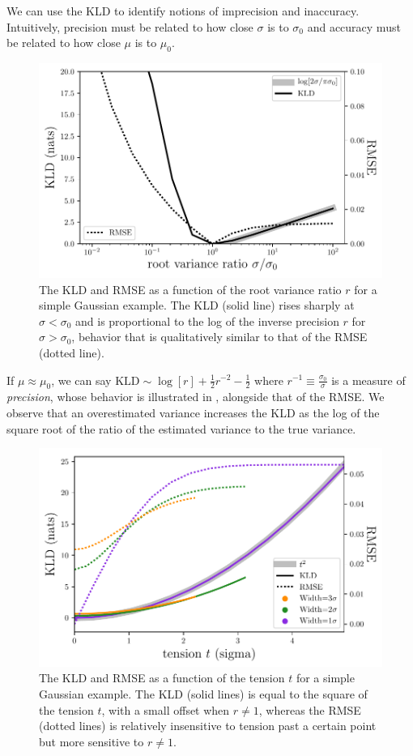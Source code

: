 We can use the KLD to identify notions of imprecision and inaccuracy.
Intuitively, precision must be related to how close $\sigma$ is to $\sigma_{0}$ 
and accuracy must be related to how close $\mu$ is to $\mu_{0}$.

\begin{figure}
	\begin{center}
		\includegraphics[width=0.74\columnwidth]{figures/qp/precision.pdf}
		\caption{The KLD and RMSE as a function of the root variance ratio $r$ for 
			a simple Gaussian example.
			The KLD (solid line) rises sharply at $\sigma<\sigma_{0}$ and is 
			proportional to the log of the inverse precision $r$ for $\sigma>\sigma_{0}$, 
			behavior that is qualitatively similar to that of the RMSE (dotted line).
			}
	\end{center}
\end{figure}

If $\mu\approx\mu_{0}$, we can say $\mathrm{KLD}\sim\log[r] + \frac{1}{2}r^{-2} 
- \frac{1}{2}$ where $r^{-1}\equiv\frac{\sigma_{0}}{\sigma}$ is a measure of 
\textit{precision}, whose behavior is illustrated in 
, alongside that of the RMSE.  We observe that an 
overestimated variance increases the KLD as the log of the square root of the 
ratio of the estimated variance to the true variance.

\begin{figure}
	\begin{center}
		\includegraphics[width=0.74\columnwidth]{figures/qp/tension.pdf}
		\caption{The KLD and RMSE as a function of the tension $t$ for a simple 
			Gaussian example.
			The KLD (solid lines) is equal to the square of the tension $t$, with a 
			small offset when $r\neq1$, whereas the RMSE (dotted lines) is relatively 
			insensitive to tension past a certain point but more sensitive to $r\neq1$.
			}
	\end{center}
\end{figure}


